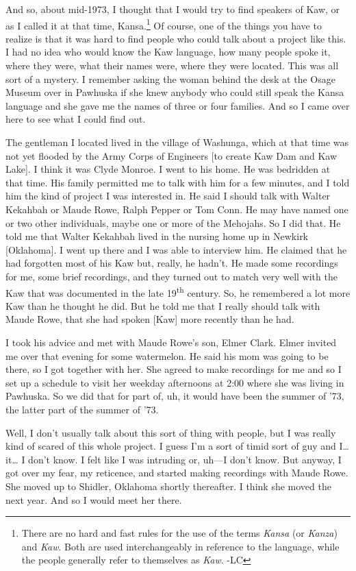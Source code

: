 \documentclass[output=paper]{LSP/langsci}
\begin{document}
And so, about mid-1973, I thought that I would try to find speakers of Kaw, or as I called it at that time, Kansa.\footnote{There are no hard and fast rules for the use of the terms \textit{Kansa} (or \textit{Kanza}) and \textit{Kaw}. Both are used interchangeably in reference to the language, while the people generally refer to themselves as \textit{Kaw}. -LC} Of course, one of the things you have to realize is that it was hard to find people who could talk about a project like this. I had no idea who would know the Kaw language, how many people spoke it, where they were, what their names were, where they were located. This was all sort of a mystery. I remember asking the woman behind the desk at the Osage Museum over in Pawhuska if she knew anybody who could still speak the Kansa language and she gave me the names of three or four families. And so I came over here to see what I could find out. 

The gentleman I located lived in the village of Washunga, which at that time was not yet flooded by the Army Corps of Engineers [to create Kaw Dam and Kaw Lake]. I think it was Clyde Monroe. I went to his home. He was bedridden at that time. His family permitted me to talk with him for a few minutes, and I told him the kind of project I was interested in. He said I should talk with Walter Kekahbah or Maude Rowe, Ralph Pepper or Tom Conn. He may have named one or two other individuals, maybe one or more of the Mehojahs. So I did that. He told me that Walter Kekahbah lived in the nursing home up in Newkirk [Oklahoma]. I went up there and I was able to interview him. He claimed that he had forgotten most of his Kaw but, really, he hadn't. He made some recordings for me, some brief recordings, and they turned out to match very well with the Kaw that was documented in the late 19\textsuperscript{th} century. So, he remembered a lot more Kaw than he thought he did. But he told me that I really should talk with Maude Rowe, that she had spoken [Kaw] more recently than he had. 

I took his advice and met with Maude Rowe's son, Elmer Clark. Elmer invited me over that evening for some watermelon. He said his mom was going to be there, so I got together with her. She agreed to make recordings for me and so I set up a schedule to visit her weekday afternoons at 2:00 where she was living in Pawhuska. So we did that for part of, uh, it would have been the summer of '73, the latter part of the summer of '73. 

Well, I don't usually talk about this sort of thing with people, but I was really kind of scared of this whole project. I guess I'm a sort of timid sort of guy and I{\ldots} it{\ldots} I don't know. I felt like I was intruding or, uh---I don't know. But anyway, I got over my fear, my reticence, and started making recordings with Maude Rowe. She moved up to Shidler, Oklahoma shortly thereafter. I think she moved the next year. And so I would meet her there. 
\end{document}
